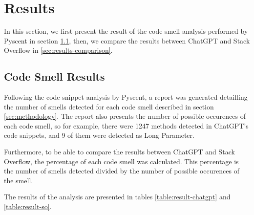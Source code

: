 \section{Results}
\label{sec:results}
In this section, we first present the result of the code smell analysis performed by Pyscent in section \ref{sec:results-code-smell}, then, we compare the results between ChatGPT and Stack Overflow in \ref{sec:results-comparison}.

\subsection{Code Smell Results}
\label{sec:results-code-smell}
Following the code snippet analysis by Pyscent, a report was generated detailling the number of smells detected for each code smell described in section \ref{sec:methodology}. The report also presents the number of possible occurences of each code smell, so for example, there were 1247 methods detected in ChatGPT's code snippets, and 9 of them were detected as Long Parameter.

Furthermore, to be able to compare the results between ChatGPT and Stack Overflow, the percentage of each code smell was calculated. This percentage is the number of smells detected divided by the number of possible occurences of the smell.

The results of the analysis are presented in tables \ref{table:result-chatgpt} and \ref{table:result-so}.

